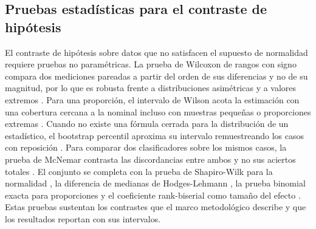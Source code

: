 \subsection{Pruebas estadísticas para el contraste de hipótesis}\label{subsec:pruebas-estadisticas}

El contraste de hipótesis sobre datos que no satisfacen el supuesto de normalidad requiere pruebas no paramétricas. La prueba de Wilcoxon de rangos con signo compara dos mediciones pareadas a partir del orden de sus diferencias y no de su magnitud, por lo que es robusta frente a distribuciones asimétricas y a valores extremos \parencite{Wilcoxon1945_individual_comparisons}. Para una proporción, el intervalo de Wilson acota la estimación con una cobertura cercana a la nominal incluso con muestras pequeñas o proporciones extremas \parencite{Wilson1927_probable_inference}. Cuando no existe una fórmula cerrada para la distribución de un estadístico, el bootstrap percentil aproxima su intervalo remuestreando los casos con reposición \parencite{Efron1994_bootstrap}. Para comparar dos clasificadores sobre los mismos casos, la prueba de McNemar contrasta las discordancias entre ambos y no sus aciertos totales \parencite{McNemar1947_sampling_error}. El conjunto se completa con la prueba de Shapiro-Wilk para la normalidad \parencite{Shapiro1965_normality}, la diferencia de medianas de Hodges-Lehmann \parencite{Hodges1956_efficiency}, la prueba binomial exacta para proporciones y el coeficiente rank-biserial como tamaño del efecto \parencite{Kerby2014_rank_biserial}. Estas pruebas sustentan los contrastes que el marco metodológico describe y que los resultados reportan con sus intervalos.

\newpage
